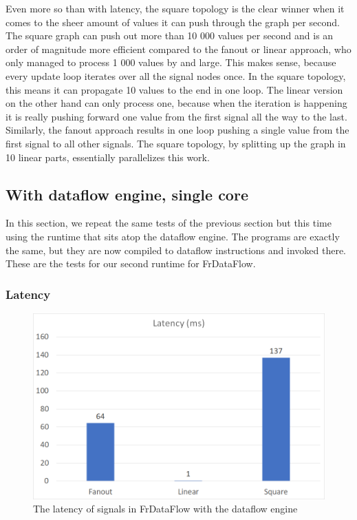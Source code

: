 Even more so than with latency, the square topology is the clear winner when it comes to the sheer amount of values it can push through the graph per second. The square graph can push out more than 10 000 values per second and is an order of magnitude more efficient compared to the fanout or linear approach, who only managed to process 1 000 values by and large. This makes sense, because every update loop iterates over all the signal nodes once. In the square topology, this means it can propagate 10 values to the end in one loop. The linear version on the other hand can only process one, because when the iteration is happening it is really pushing forward one value from the first signal all the way to the last. Similarly, the fanout approach results in one loop pushing a single value from the first signal to all other signals. The square topology, by splitting up the graph in 10 linear parts, essentially 
parallelizes this work. 

\newpage
\subsection{With dataflow engine, single core}

In this section, we repeat the same tests of the previous section but this time using the runtime that sits atop the dataflow engine. The programs are exactly the same, but they are now compiled to dataflow instructions and invoked there. These are the tests for our second runtime for FrDataFlow. 

\subsubsection{Latency}

\begin{figure}[h]
    \includegraphics[width=\textwidth]{images/Evaluation-WithDataFlow-Latency.png}
	\caption{The latency of signals in FrDataFlow with the dataflow engine}
	\label{fig:evaluation-withdataflow-latency}
\end{figure}

